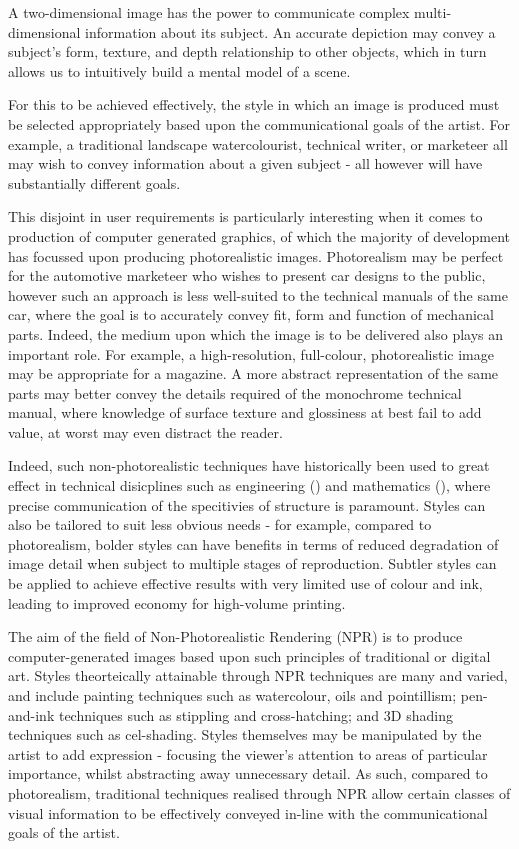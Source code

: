 A two-dimensional image has the power to communicate complex multi-dimensional information about its subject.
An accurate depiction may convey a subject's form, texture, and depth relationship to other objects, which in turn allows us to intuitively build a mental model of a scene.

For this to be achieved effectively, the style in which an image is produced must be selected appropriately based upon the communicational goals of the artist.
For example, a traditional landscape watercolourist, technical writer, or marketeer all may wish to convey information about a given subject - all however will have substantially different goals.

This disjoint in user requirements is particularly interesting when it comes to production of computer generated graphics, of which the majority of development has focussed upon producing photorealistic images.
Photorealism may be perfect for the automotive marketeer who wishes to present car designs to the public, however such an approach is less well-suited to the technical manuals of the same car, where the goal is to accurately convey fit, form and function of mechanical parts.
Indeed, the medium upon which the image is to be delivered also plays an important role.
For example, a high-resolution, full-colour, photorealistic image may be appropriate for a magazine. 
A more abstract representation of the same parts may better convey the details required of the monochrome technical manual, where knowledge of surface texture and glossiness at best fail to add value, at worst may even distract the reader.

Indeed, such non-photorealistic techniques have historically been used to great effect in technical disicplines such as engineering (\cite{porter1988}) and mathematics (\cite{francis2007}), where precise communication of the specitivies of structure is paramount. Styles can also be tailored to suit less obvious needs - for example, compared to photorealism, bolder styles can have benefits in terms of reduced degradation of image detail when subject to multiple stages of reproduction. Subtler styles can be applied to achieve effective results with very limited use of colour and ink, leading to improved economy for high-volume printing.

The aim of the field of Non-Photorealistic Rendering (NPR) is to produce computer-generated images based upon such principles of traditional or digital art.
Styles theorteically attainable through NPR techniques are many and varied, and include painting techniques such as watercolour, oils and pointillism; pen-and-ink techniques such as stippling and cross-hatching; and 3D shading techniques such as cel-shading.
Styles themselves may be manipulated by the artist to add expression - focusing the viewer's attention to areas of particular importance, whilst abstracting away unnecessary detail.
As such, compared to photorealism, traditional techniques realised through NPR allow certain classes of visual information to be effectively conveyed in-line with the communicational goals of the artist.

